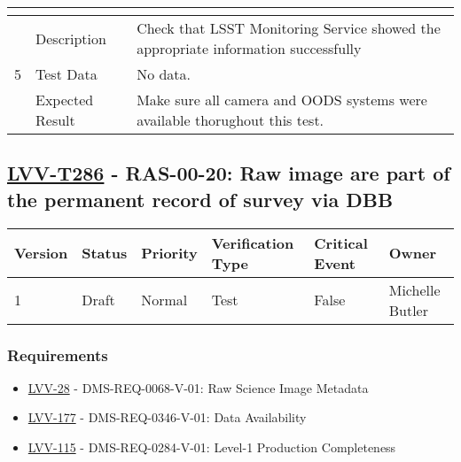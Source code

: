 \begin{longtable}[]{p{1.3cm}p{2cm}p{13cm}}
\begin{minipage}[t]{13cm}
{                \vspace{\dp0}
                } \end{minipage}
        \\ \midrule

            \multirow{3}{*}{ 5 } & Description &
            \begin{minipage}[t]{13cm}{\footnotesize
            Check that LSST Monitoring Service showed the appropriate information
successfully

            \vspace{\dp0}
            } \end{minipage} \\ \cline{2-3}
            & Test Data &
            \begin{minipage}[t]{13cm}{\footnotesize
                No data.
                \vspace{\dp0}
            } \end{minipage} \\ \cline{2-3}
            & Expected Result &
                \begin{minipage}[t]{13cm}{\footnotesize
                Make sure all camera and OODS systems were available thorughout this
test.~ ~

                \vspace{\dp0}
                } \end{minipage}
        \\ \midrule
    \end{longtable}

\subsection{\href{https://jira.lsstcorp.org/secure/Tests.jspa\#/testCase/LVV-T286}{LVV-T286}
    - RAS-00-20: Raw image are part of the permanent record of survey via DBB}\label{lvv-t286}

\begin{longtable}[]{llllll}
\toprule
Version & Status & Priority & Verification Type & Critical Event & Owner
\\\midrule
1 & Draft & Normal &
Test & False & Michelle Butler
\\\bottomrule
\end{longtable}

\subsubsection{Requirements}
\begin{itemize}
\item \href{https://jira.lsstcorp.org/browse/LVV-28}{LVV-28} - DMS-REQ-0068-V-01: Raw Science Image Metadata
\item \href{https://jira.lsstcorp.org/browse/LVV-177}{LVV-177} - DMS-REQ-0346-V-01: Data Availability
\item \href{https://jira.lsstcorp.org/browse/LVV-115}{LVV-115} - DMS-REQ-0284-V-01: Level-1 Production Completeness
\end{itemize}

